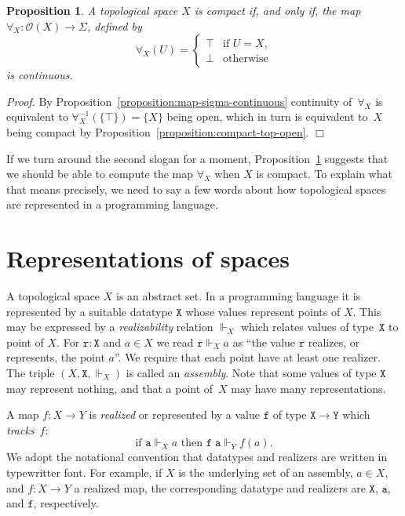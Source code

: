 \documentclass[a4paper,10pt]{article}
\newtheorem{proposition}[theorem]{Proposition}
\newenvironment{proof}{\par\noindent\textit{Proof.}}{\hfill$\Box$\par\medskip}
\newcommand{\set}[1]{\{#1\}}
\newcommand{\tpl}[1]{\mathcal{O}(#1)}
\newcommand{\R}[1]{\mathtt{#1}}
\newcommand{\rz}{\Vdash}
\begin{document}
\begin{proposition}
  \label{proposition:compact-iff-forall-continuous} A topological space $X$ is compact if, and only if, the map $\forall_X : \tpl{X} \to \Sigma$, defined by
  \begin{equation*} \forall_X(U) =
    \begin{cases} \top & \text{if $U = X$,}\\ \bot & \text{otherwise}
    \end{cases}
  \end{equation*}
  is continuous.
\end{proposition}

\begin{proof} By Proposition~\ref{proposition:map-sigma-continuous} continuity of~$\forall_X$ is equivalent to $\forall_X^{-1}(\set{\top}) = \set{X}$ being open, which in turn is equivalent to~$X$ being compact by Proposition~\ref{proposition:compact-top-open}.
\end{proof}

If we turn around the second slogan for a moment, Proposition~\ref{proposition:compact-iff-forall-continuous} suggests that we should be able to compute the map $\forall_X$ when $X$ is compact. To explain what that means precisely, we need to say a few words about how topological spaces are represented in a programming language.

\section{Representations of spaces}
\label{sec:representations}

A topological space $X$ is an abstract set. In a programming language it is represented by a suitable datatype $\mathtt{X}$ whose values represent points of $X$. This may be expressed by a \emph{realizability} relation $\rz_X$ which relates values of type~$\mathtt{X}$ to point of $X$. For $\R{r} : \mathtt{X}$ and $a \in X$ we read $\R{r} \rz_X a$ as ``the value $\R{r}$ realizes, or represents, the point $a$''. We require that each point have at least one realizer. The triple $(X, \mathtt{X}, {\rz_X})$ is called an \emph{assembly}. Note that some values of type $\mathtt{X}$ may represent nothing, and that a point of~$X$ may have many representations.

A map $f : X \to Y$ is \emph{realized} or represented by a value $\R{f}$ of type $\mathtt{X} \to \mathtt{Y}$ which \emph{tracks}~$f$:
%
\begin{equation*} \text{if $\R{a} \rz_X a$ then $\R{f}\;\R{a} \rz_Y f(a)$.}
\end{equation*}
%
We adopt the notational convention that datatypes and realizers are written in typewritter font. For example, if $X$ is the underlying set of an assembly, $a \in X$, and $f : X \to Y$ a realized map, the corresponding datatype and realizers are $\mathtt{X}$, $\R{a}$, and $\R{f}$, respectively.
\end{document}
